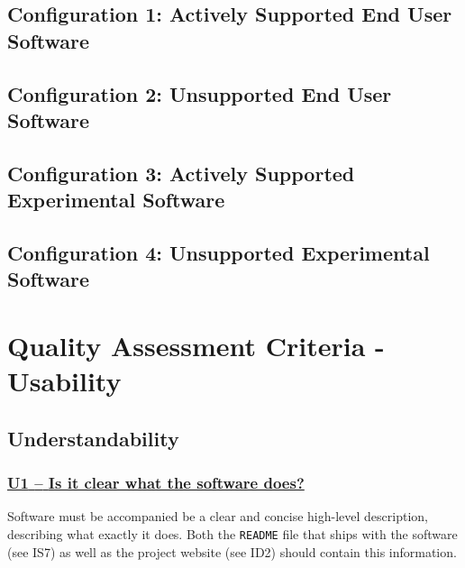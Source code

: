 \documentclass[a4paper,11pt]{article}
\newcommand{\indicator}[1]{\subsubsection*{\underline{#1}}}
\begin{document}
\subsection{Configuration 1: Actively Supported End User Software} 
\one 
\two 
\three
\four
\five
\six \seven \eight \nine \ten \eleven \twelve \thirteen \fourteen \fifteen
\nineOne \nineTwo \nineThree \nineFour \nineFive \nineSix \nineSeven \nineEight \nineNine \nineTen \nineEleven \nineTwelve \nineThirteen

\subsection{Configuration 2: Unsupported End User Software} 

\subsection{Configuration 3: Actively Supported Experimental Software} 

\subsection{Configuration 4: Unsupported Experimental Software} 





\section{Quality Assessment Criteria - Usability}\label{sec:usab}


\subsection{Understandability}\label{sec:und}

\newcommand{\uOneName}{U1}
\newcommand{\uOneID}{\uOneName}
\newcommand{\uOneText}{Is it clear what the software does?}
\indicator{\uOneName{ }--{ }\uOneText}\label{id:u1}

Software must be accompanied be a clear and concise high-level description,
describing what exactly it does. Both the \texttt{README} file that ships with
the software (see IS7) as well as the project website (see ID2) should contain
this information. 
\end{document}
